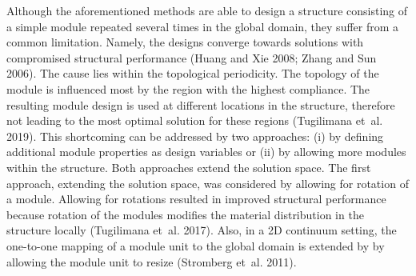 Although the aforementioned methods are able to design a structure consisting of a simple module repeated several times in the global domain, they suffer from a common limitation. Namely, the designs converge towards solutions with compromised structural performance (Huang and Xie 2008; Zhang and Sun 2006). The cause lies within the topological periodicity. The topology of the module is influenced most by the region with the highest compliance. The resulting module design is used at different locations in the structure, therefore not leading to the most optimal solution for these regions (Tugilimana et al. 2019). This shortcoming can be addressed by two approaches: (i) by defining additional module properties as design variables or (ii) by allowing more modules within the structure. Both approaches extend the solution space. The first approach, extending the solution space, was considered by allowing for rotation of a module. Allowing for rotations resulted in improved structural performance because rotation of the modules modifies the material distribution in the structure locally (Tugilimana et al. 2017). Also, in a 2D continuum setting, the one-to-one mapping of a module unit to the global domain is extended by by allowing the module unit to resize (Stromberg et al. 2011).  